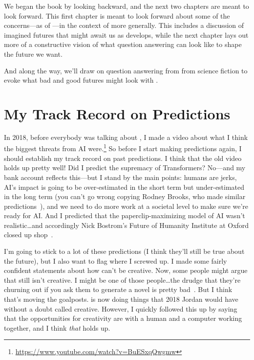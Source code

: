\label{ch:scifi}


We began the book by looking backward, and the next two chapters are meant to look forward.  This first chapter is meant to look forward about some of the concerns---as of \currentyear{}---in the context of  more generally.
%
This includes a discussion of imagined futures that might await us as
 develops, while the next chapter lays out more of a
constructive vision of what question answering can look like to shape
the future we want.

And along the way, we'll draw on question answering from from science
fiction to evoke what bad and good futures might look with .

\section{My Track Record on  Predictions}

In 2018, before everybody was talking about , I made a video
about what I think the biggest threats from AI
were.\footnote{\url{https://www.youtube.com/watch?v=BuESxqQwgmw}}
%
So before I start making predictions again, I should establish my
track record on past predictions.
%
I think that the old video holds up pretty well! Did I predict the
supremacy of Transformers? No---and my bank account reflects
this---but I stand by the main points: humans are jerks, AI’s impact
is going to be over-estimated in the short term but under-estimated in
the long term (you can’t go wrong copying Rodney Brooks, who made
similar predictions~\cite{}), and we need to do more work at a
societal level to make sure we’re ready for AI. And I predicted that
the paperclip-maximizing model of AI wasn’t realistic\dots and accordingly
Nick Bostrom’s Future of Humanity Institute at Oxford closed up shop~\cite{}.

I'm going to stick to a lot of these predictions (I think they'll
still be true about the future), but I also want to flag where I
screwed up.
%
I made some fairly confident statements about how  can't be creative.
%
Now, some people might argue that  still isn't creative.
%
I might be one of those people\dots the drudge that they're churning
out if you ask them to generate a novel is pretty bad~\cite{}.
%
But I think that's moving the goalposts.
%
 is now doing things that 2018 Jordan would have without a
doubt called creative.
%
However, I quickly followed this up by saying that the opportunities
for creativity are with a human and a computer working together, and I
think \emph{that} holds up.

